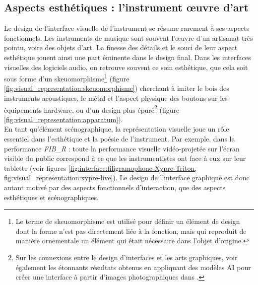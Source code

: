 \subsection{Aspects esthétiques : l'instrument œuvre d'art}

\noindent Le design de l'interface visuelle de l'instrument se résume rarement à ses aspects fonctionnels. Les instruments de musique sont souvent l'œuvre d'un artisanat très pointu, voire des objets d'art. La finesse des détails et le souci de leur aspect esthétique jouent ainsi une part éminente dans le design final. Dans les interfaces visuelles des logiciels audio, on retrouve souvent ce soin esthétique, que cela soit sous forme d'un skeuomorphisme\footnote{Le terme de skeuomorphisme est utilisé pour définir un élément de design dont la forme n'est pas directement liée à la fonction, mais qui reproduit de manière ornementale un élément qui était nécessaire dans l'objet d'origine.} (figure \ref{fig:visual_representation:skeuomorphisme}) cherchant à imiter le bois des instruments acoustiques, le métal et l'aspect physique des boutons sur les équipements hardware, ou d'un design plus épuré\footnote{Sur les connexions entre le design d'interfaces et les arts graphiques, voir également les étonnants résultats obtenus en appliquant des modèles AI pour créer une interface à partir d'images photographiques dans \cite{troyer_mondrian_2019}.}  (figure \ref{fig:visual_representation:apparatum}).\\
\indent En tant qu'élément scénographique, la représentation visuelle joue un rôle essentiel dans l'esthétique et la poésie de l'instrument. Par exemple, dans la performance \textit{FIB\_R} : toute la performance visuelle vidéo-projetée sur l'écran visible du public correspond à ce que les instrumentistes ont face à eux sur leur tablette (voir figures \ref{fig:interface:filigramophone-Xypre-Triton, fig:visual_representation:xypre-live}). Le design de l'interface graphique est donc autant motivé par des aspects fonctionnels d'interaction, que des aspects esthétiques et scénographiques.

